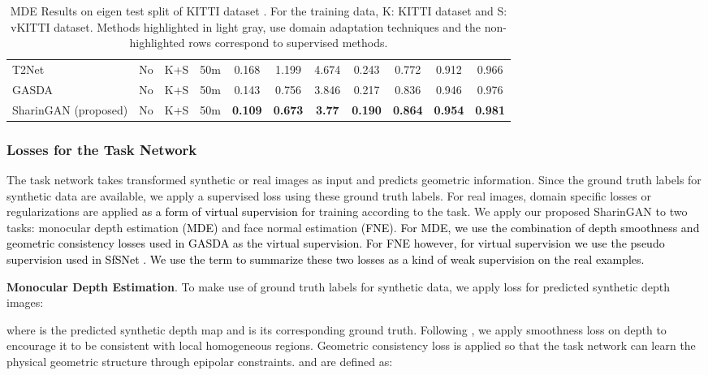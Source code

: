 \documentclass[10pt,twocolumn,letterpaper]{article}
\newcommand{\camready}[1]{\textcolor{black}{#1}}
\begin{document}
\begin{table*}
\begin{adjustbox}{width=\linewidth}
\begin{tabular}{|l||c|c|c||c|c|c|c|c|c|c|}
         \rowcolor{lightgray} T2Net \cite{T2NET} & No & K+S & 50m & 0.168 & 1.199 & 4.674 & 0.243 & 0.772 & 0.912 & 0.966\\
         \rowcolor{lightgray} GASDA \cite{GASDA} & No & K+S & 50m & 0.143 & 0.756 & 3.846 & 0.217 & 0.836 & 0.946 & 0.976\\
\rowcolor{lightgray} SharinGAN (proposed) & No & K+S & 50m & \textbf{0.109} & \textbf{0.673} & \textbf{3.77} & \textbf{0.190} & \textbf{0.864} & \textbf{0.954} & \textbf{0.981}\\
    \hline
    \end{tabular}
    \end{adjustbox}
    \caption{MDE Results on eigen test split of KITTI dataset \cite{Eigen2014} . For the training data, K: KITTI dataset and S: vKITTI dataset. Methods highlighted in light gray, use domain adaptation techniques and the non-highlighted rows correspond to supervised methods.}
    \vspace{-5mm}
    \label{tab:mde_results}
\end{table*}


\subsubsection{Losses for the Task Network}\label{vs}
The task network takes transformed synthetic or real images as input and predicts geometric information.
Since the ground truth labels for synthetic data are available, we apply a supervised loss using these ground truth labels.
For real images, domain specific losses or regularizations are applied \camready{as a form of virtual supervision} for training according to the task. 
We apply our proposed SharinGAN to two tasks: monocular depth estimation \camready{(MDE)} and face normal estimation \camready{(FNE)}. 
\camready{For MDE, we use the combination of depth smoothness and geometric consistency losses used in GASDA \cite{GASDA} as the virtual supervision. For FNE however, for virtual supervision we use the pseudo supervision used in SfSNet \cite{SfSNet}. We use the term \say{virtual supervision} to summarize these two losses as a kind of weak supervision on the real examples.}

\textbf{Monocular Depth Estimation}.
To make use of ground truth labels for synthetic data, we apply  loss for predicted synthetic depth images:

where  is the predicted synthetic depth map and  is its corresponding ground truth.
Following \cite{GASDA}, we apply smoothness loss on depth  to encourage it to be consistent with local homogeneous regions. Geometric consistency loss  is applied so that the task network can learn the physical geometric structure through epipolar constraints.
 and  are defined as:
\end{document}
